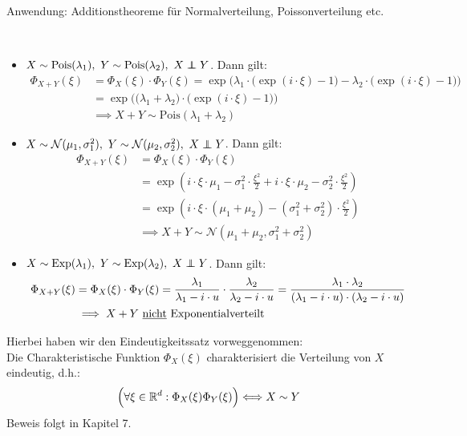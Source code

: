 Anwendung: Additionstheoreme für Normalverteilung, Poissonverteilung etc.

\begin{beisp}\
\begin{itemize}
\item $X\sim\text{Pois}(\lambda_1),~Y\sim\text{Pois}(\lambda_2),~X\unab Y$. Dann gilt:
\begin{align*}
\Phi_{X+Y}(\xi)
&=\Phi_X(\xi)\cdot\Phi_Y(\xi)=\exp\Big(\lambda_1\cdot\big(\exp(i\cdot\xi)-1\big)-\lambda_2\cdot\big(\exp(i\cdot\xi)-1\big)\Big)\\
&=\exp\Big(\big(\lambda_1+\lambda_2\big)\cdot\big(\exp(i\cdot\xi)-1\big)\Big)\\
&\implies X+Y\sim\text{Pois}(\lambda_1+\lambda_2)
\end{align*}
\item $X\sim\mathcal{N}(\mu_1,\sigma_1^2),~Y\sim\mathcal{N}(\mu_2,\sigma_2^2),~X\unab Y$. Dann gilt:
\begin{align*}
\Phi_{X+Y}(\xi)
&=\Phi_X(\xi)\cdot\Phi_Y(\xi)\\
&=\exp\left(i\cdot\xi\cdot\mu_1-\sigma_1^2\cdot\frac{\xi^2}{2}+i\cdot\xi\cdot\mu_2-\sigma_2^2\cdot\frac{\xi^2}{2}\right)\\
&=\exp\left(i\cdot\xi\cdot(\mu_1+\mu_2)-(\sigma_1^2+\sigma_2^2)\cdot\frac{\xi^2}{2}\right)\\
&\implies
X+Y\sim\mathcal{N}(\mu_1+\mu_2,\sigma_1^2+\sigma_2^2)
\end{align*}
\item $X\sim\text{Exp}(\lambda_1),~Y\sim\text{Exp}(\lambda_2),~X\unab Y$. Dann gilt:
\begin{align*}
\Phi_{X+Y}(\xi)
&=\Phi_X(\xi)\cdot\Phi_Y(\xi)
=\frac{\lambda_1}{\lambda_1-i\cdot u}\cdot\frac{\lambda_2}{\lambda_2-i\cdot u}
=\frac{\lambda_1\cdot\lambda_2}{(\lambda_1-i\cdot u)\cdot(\lambda_2-i\cdot u)}\\
&\implies X+Y\text{ \underline{nicht} Exponentialverteilt}
\end{align*}
\end{itemize}
\end{beisp}

\begin{bemerkung}
Hierbei haben wir den Eindeutigkeitssatz vorweggenommen:\\
Die Charakteristische Funktion $\Phi_X(\xi)$ charakterisiert die Verteilung von $X$ eindeutig, d.h.:
\begin{align*}
\Big(\forall\xi\in\mathbb{R}^d:\Phi_X(\xi)\Phi_Y(\xi)\Big)\Longleftrightarrow X\sim Y
\end{align*}
Beweis folgt in Kapitel 7.
\end{bemerkung}

